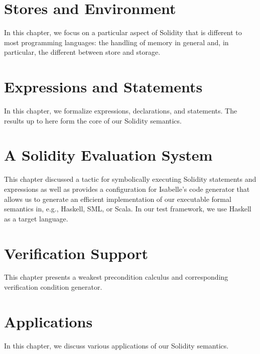 \documentclass[10pt,DIV17,a4paper,abstract=true,twoside=semi,openright]
{scrreprt}
\begin{document}



\chapter{Stores and Environment}
In this chapter, we focus on a particular aspect of Solidity that is
different to most programming languages: the handling of memory in
general and, in particular, the different between store and storage.




\chapter{Expressions and Statements}

In this chapter, we formalize expressions, declarations, and
statements. The results up to here form the core of our Solidity
semantics. 






\chapter{A Solidity Evaluation System}
This chapter discussed a tactic for symbolically executing Solidity statements
and expressions as well as provides a configuration for Isabelle's code
generator that allows us to generate an efficient implementation of our
executable formal semantics in, e.g., Haskell, SML, or Scala. In our test
framework, we use Haskell as a target language.



\chapter{Verification Support}
This chapter presents a weakest precondition calculus and corresponding verification condition generator.



\chapter{Applications}
In this chapter, we discuss various applications of our Solidity
semantics.




\end{document}
